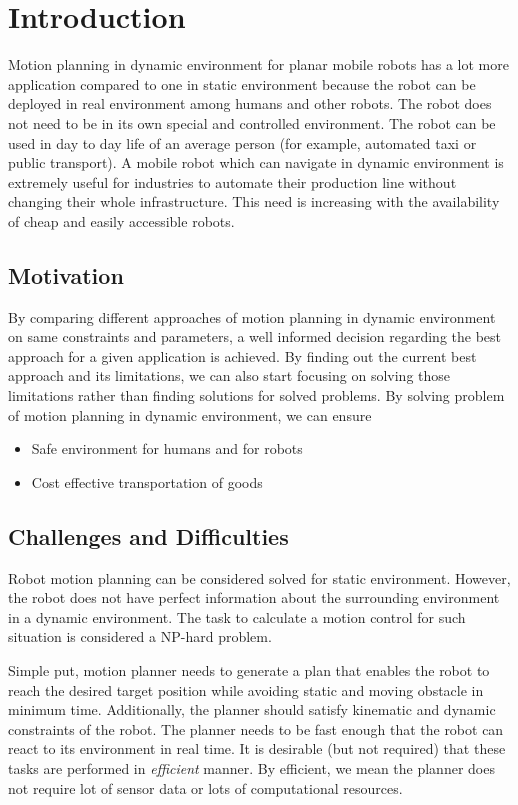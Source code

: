 
\chapter{Introduction}

Motion planning in dynamic environment for planar mobile robots has a lot more application compared to one in static 
environment because the robot can be deployed in real environment among humans and other robots. 
The robot does not need to be in its own special and controlled environment. The robot can be 
used in day to day life of an average person (for example, automated taxi or public transport).
A mobile robot which can navigate in dynamic environment is extremely useful for industries to 
automate their production line without changing their whole infrastructure.
This need is increasing with the availability of cheap and easily accessible robots. 

\section{Motivation}
\label{sec:motivation}
By comparing different approaches of motion planning in dynamic environment on same constraints and parameters, 
a well informed decision regarding the best approach for a given application is achieved. By finding out the 
current best approach and its limitations, we can also start focusing on solving those limitations
rather than finding solutions for solved problems. 
By solving problem of motion planning in dynamic environment, we can ensure 
\begin{itemize}
    \item Safe environment for humans and for robots
    \item Cost effective transportation of goods
\end{itemize}


\section{Challenges and Difficulties}
\label{sec:challenges_and_difficulties}
Robot motion planning can be considered solved for static environment\cite{large2005navigation}.  
However, the robot does not have perfect information about the surrounding environment in a
dynamic environment. The task to calculate a motion control for such situation is considered
a NP-hard problem\cite{keshmiri2009overview}. 

Simple put, motion planner needs to generate a plan that
enables the robot to reach the desired target position while avoiding static and moving obstacle in minimum time.
Additionally, the planner should satisfy kinematic and dynamic constraints of the robot.
The planner needs to be fast enough that the robot can react to its environment in real time.
It is desirable (but not required) that these tasks are performed in \textit{efficient} manner. By efficient, we mean 
the planner does not require lot of sensor data or lots of computational resources.

